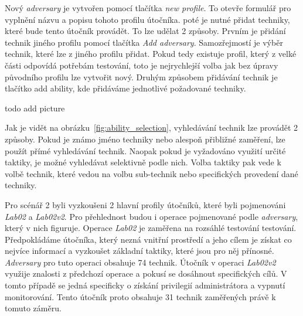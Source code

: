 \noindent
Nový \textit{adversary} je vytvořen pomocí tlačítka \textit{new profile}.
To otevře formulář pro vyplnění názvu a popisu tohoto profilu útočníka.
poté je nutné přidat techniky, které bude tento útočník provádět.
To lze udělat 2 způsoby.
Prvním je přidání  technik jiného profilu pomocí tlačítka \textit{Add adversary}.
Samozřejmostí je výběr technik, které lze z jiného profilu přidat.
Pokud tedy existuje profil, který z velké části odpovídá potřebám testování, toto je nejrychlejší volba jak bez úpravy původního profilu lze vytvořit nový.
Druhým způsobem přidávání technik je tlačítko add ability, kde přidáváme jednotlivé požadované techniky.

todo add picture\label{fig:ability_selection}

Jak je vidět na obrázku~\ref{fig:ability_selection}, vyhledávání technik lze provádět 2 způsoby.
Pokud je známo jméno techniky nebo alespoň přibližné zaměření, lze použít přímé vyhledávání technik.
Naopak pokud je vyžadováno využití určité taktiky, je možné vyhledávat selektivně podle nich.
Volba taktiky pak vede k volbě technik, které vedou na volbu sub-technik nebo specifických provedení dané techniky.

Pro scénář 2 byli vyzkoušeni 2 hlavní profily útočníků, které byli pojmenováni \textit{Lab02} a \textit{Lab02v2}.
Pro přehlednost budou i operace pojmenované podle \textit{adversary}, který v nich figuruje.
Operace \textit{Lab02} je zaměřena na rozsáhlé testování testování.
Předpokládáme útočníka, který nezná vnitřní prostředí a jeho cílem je získat co nejvíce informací a vyzkoušet základní taktiky, které jsou pro něj přínosné.
\textit{Adversary} pro tuto operaci obsahuje 74 technik.
Útočník v operaci \textit{Lab02v2} využije znalosti z předchozí operace a pokusí se dosáhnout specifických cílů.
V tomto případě se jedná specificky o získání privilegií administrátora a vypnutí monitorování.
Tento útočník proto obsahuje 31 technik zaměřených právě k tomuto záměru.


